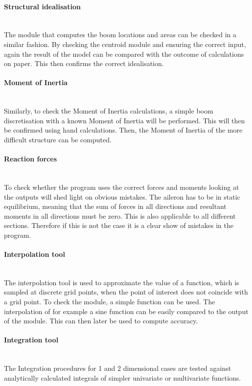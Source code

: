 \paragraph{Structural idealisation}\\
The module that computes the boom locations and areas can be checked in a similar fashion. By checking the centroid module and ensuring the correct input, again the result of the model can be compared with the outcome of calculations on paper. This then confirms the correct idealisation.

\paragraph{Moment of Inertia}\\
Similarly, to check the Moment of Inertia calculations, a simple boom discretisation with a known Moment of Inertia will be performed. This will then be confirmed using hand calculations. Then, the Moment of Inertia of the more difficult structure can be computed.

\paragraph{Reaction forces}\\ To check whether the program uses the correct forces and moments looking at the outputs will shed light on obvious mistakes. The aileron has to be in static equilibrium, meaning that the sum of forces in all directions and resultant moments in all directions must be zero. This is also applicable to all different sections. Therefore if this is not the case it is a clear show of mistakes in the program.

\paragraph{Interpolation tool}\\
The interpolation tool is used to approximate the value of a function, which is sampled at discrete grid points, when the point of interest does not coincide with a grid point. To check the module, a simple function can be used. The interpolation of for example a sine function can be easily compared to the output of the module. This can then later be used to compute accuracy.

\paragraph{Integration tool}\\
The Integration procedures for 1 and 2 dimensional cases are tested against analytically calculated integrals of simpler univariate or multivariate functions.



